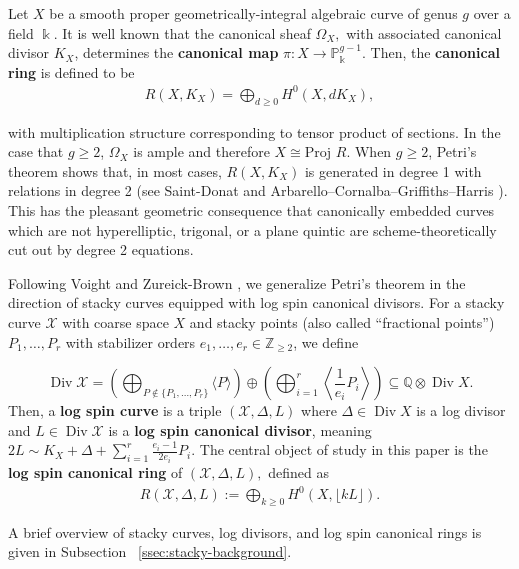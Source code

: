\documentclass{amsart}
\theoremstyle{plain}
\theoremstyle{definition}
\theoremstyle{remark}
\numberwithin{equation}{section}
\newcommand\BQ{{\mathbb Q}}
\newcommand\BP{{\mathbb P}}
\newcommand\BZ{{\mathbb Z}}
\newcommand\Bk{{\Bbbk}}
\newcommand\proj{\text{Proj }}
\DeclareMathOperator\di{Div}
\newcommand\sx{\mathscr X}
\newcommand \subhalf[1]{\frac{{#1} - 1}{2{#1}}}
\newcommand{\halfcan}{L}
\begin{document}
Let $X$ be a smooth proper geometrically-integral algebraic curve of genus $g$ over a field $\Bk$.
It is well known that the canonical sheaf $\Omega _X,$ with
associated canonical divisor $K_X$, determines the {\bf canonical
map } $\pi: X \rightarrow \BP_\Bk^{g - 1}$. Then, the {\bf canonical
ring} is defined to be
\begin{align*}
	R(X, K_X) = \bigoplus_{d \geq 0} H^0(X, dK_X),
\end{align*}

\noindent
with multiplication structure corresponding to tensor product of
sections. In the case that $g \geq 2$, $\Omega_X$ is ample and
therefore $X \cong \proj R$. When $g \geq 2$, Petri's theorem 
shows that, in most cases, $R(X, K_X)$
is generated in degree 1 with relations in degree 2 (see
Saint-Donat \cite[p. 157]{saint-donat:proj} and Arbarello--Cornalba--Griffiths--Harris
\cite[Section 3.3]{acgh:algebraic-curves}). This has the pleasant 
geometric consequence that canonically embedded curves which are not hyperelliptic, trigonal, or a plane quintic are
scheme-theoretically cut out by degree 2 equations.

Following Voight and Zureick-Brown \cite{vzb:stacky}, we generalize 
Petri's theorem in the direction of stacky curves equipped with
log spin canonical divisors. For a stacky curve $\sx$ with coarse space $X$ and
stacky points (also called ``fractional points'') $P_1, \ldots, P_r$
with stabilizer orders $e_1, \ldots, e_r \in \BZ_{\geq 2}$, we define

\[
	\di \sx = \left(\bigoplus_{P\notin \{P_1, \ldots, P_r\}} \langle 
	P \rangle \right) \oplus \left(\bigoplus_{i = 1}^r \left \langle 
	\frac{1}{e_i}P_i \right \rangle \right) \subseteq \BQ \otimes \di X.
\]
Then, a {\bf log spin curve} is a triple $(\sx, \Delta, \halfcan)$
where $\Delta \in \di X$ is a log divisor and $L \in \di \sx$ is a {\bf log spin canonical divisor}, meaning $2\halfcan \sim K_X +
\Delta + \sum_{i = 1}^{r} \subhalf{e_i} P_i$. The central object of
study in this paper is the {\bf log spin canonical ring} of $(\sx,
\Delta, \halfcan),$ defined as
\begin{align*}
	R(\sx, \Delta, \halfcan) := \bigoplus_{k \geq 0} H^0(X, \lfloor k \halfcan \rfloor).
\end{align*}

\noindent
A brief overview of stacky curves, log divisors, and log spin
canonical rings is given in Subsection
~\ref{ssec:stacky-background}.
\end{document}
